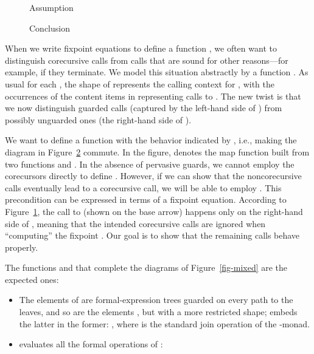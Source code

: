 \documentclass[preprint,draft]
{sigplanconf}
\newcommand{\<}{\langle}
\renewcommand{\>}{\rangle}
\begin{document}
\begin{figure*}
\centering
        \begin{subfigure}[b]{0.52\textwidth}
\centering

                \caption{Assumption}
                \label{fig-mixed-asm}
        \end{subfigure}\enskip\quad
\vspace*{1ex}
\hspace*{1ex}
                \begin{subfigure}[b]{0.43\textwidth}

                \caption{Conclusion}
                \label{fig-mixed-concl}
        \end{subfigure}\vspace*{-2ex}
\caption{Mixed fixpoint}
\label{fig-mixed}
\end{figure*}



When we write fixpoint equations to define a function , we often want to
distinguish corecursive calls from calls that are sound for other reasons---for
example, if they terminate.
We model this situation abstractly
by a function . As usual for each ,
the shape of  represents the calling context for , with the occurrences of
the content items  in  representing calls to . The new twist is that we now distinguish
guarded calls (captured by the left-hand side of ) from possibly unguarded ones
(the right-hand side of ).




We want to define a function  with the behavior indicated by , i.e., making the diagram in Figure~\ref{fig-mixed-concl} commute.
In the figure,
 denotes the map function
 built from two functions  and .
In the absence of pervasive guards, we cannot employ the corecursors directly to
define .
However, if we can show that the noncorecursive calls eventually lead to a corecursive call, we will be able to employ .
This precondition can be expressed in terms of a fixpoint equation.
According to Figure~\ref{fig-mixed-asm},
the call to  (shown on the base arrow) happens only on the right-hand side of , meaning that the intended
corecursive calls are ignored when ``computing'' the fixpoint .
Our goal is to show that the remaining calls behave properly.

The functions  and  that complete the diagrams of Figure~\ref{fig-mixed}
are the expected ones:
\begin{itemize}
\item The elements of  are formal-expression trees guarded on every path to the leaves,
and so are the elements , but with a more restricted shape;
 embeds the latter in the former: , where  is the standard join
operation of the -monad.
\item  evaluates all the formal operations of :

\end{itemize}
\end{document}
